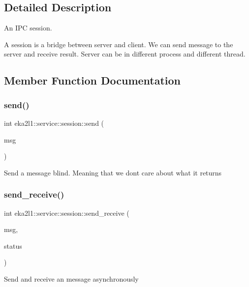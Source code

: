 \subsection{Detailed Description}
An I\+PC session. 

A session is a bridge between server and client. We can send message to the server and receive result. Server can be in different process and different thread. 

\subsection{Member Function Documentation}
\mbox{\label{classeka2l1_1_1service_1_1session_a03c16b770ef9cfafec551263b3a9854b}} 
\subsubsection{\texorpdfstring{send()}{send()}}
{\footnotesize\ttfamily int eka2l1\+::service\+::session\+::send (\begin{DoxyParamCaption}\item[{ipc\+\_\+msg\+\_\+ptr \&}]{msg }\end{DoxyParamCaption})}

Send a message blind. Meaning that we don\textquotesingle{}t care about what it returns \mbox{\label{classeka2l1_1_1service_1_1session_ab1c2c7f662a47b7727935e29d4e3a7ba}} 
\subsubsection{\texorpdfstring{send\+\_\+receive()}{send\_receive()}}
{\footnotesize\ttfamily int eka2l1\+::service\+::session\+::send\+\_\+receive (\begin{DoxyParamCaption}\item[{ipc\+\_\+msg\+\_\+ptr \&}]{msg,  }\item[{int \&}]{status }\end{DoxyParamCaption})}

Send and receive an message asynchronously \mbox{\label{classeka2l1_1_1service_1_1session_a54de54e7b2381b4a0780669d731cef4d}} 
